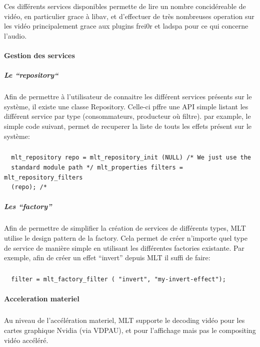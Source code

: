 Ces différents services disponibles permette de lire un nombre
concidéreable de vidéo, en particulier grace à libav, et d'effectuer
de très nombreuses operation sur les vidéo principalement grace aux
plugins frei0r et ladspa pour ce qui concerne l'audio.

\paragraph{Gestion des services}

\subparagraph{Le ``repository``}

Afin de permettre à l'utilisateur de connaitre les différent services
présents sur le système, il existe une classe Repository. Celle-ci
pffre une API simple listant les différent service par type
(consommateurs, producteur où filtre).  par example, le simple code
suivant, permet de recuperer la liste de touts les effets présent sur
le système:

\subparagraph{}

\begin{lstlisting}
  mlt_repository repo = mlt_repository_init (NULL) /* We just use the
  standard module path */ mlt_properties filters = mlt_repository_filters
  (repo); /*
\end{lstlisting}

\subparagraph{Les ``factory''}

Afin de permettre de simplifier la création de services de différents
types, MLT utilise le design pattern de la factory. Cela permet de
créer n'importe quel type de service de manière simple en utilisant les
différentes factories existante.  Par exemple, afin de créer un effet
``invert'' depuis MLT il suffi de faire:

\subparagraph{}

\begin{lstlisting}
  filter = mlt_factory_filter ( "invert", "my-invert-effect");
\end{lstlisting}

\paragraph{Acceleration materiel}

\subparagraph{}

Au niveau de l'accélération materiel, MLT supporte le decoding
vidéo pour les cartes graphique Nvidia  (via VDPAU), et pour l'affichage mais pas le
compositing vidéo accéléré.

